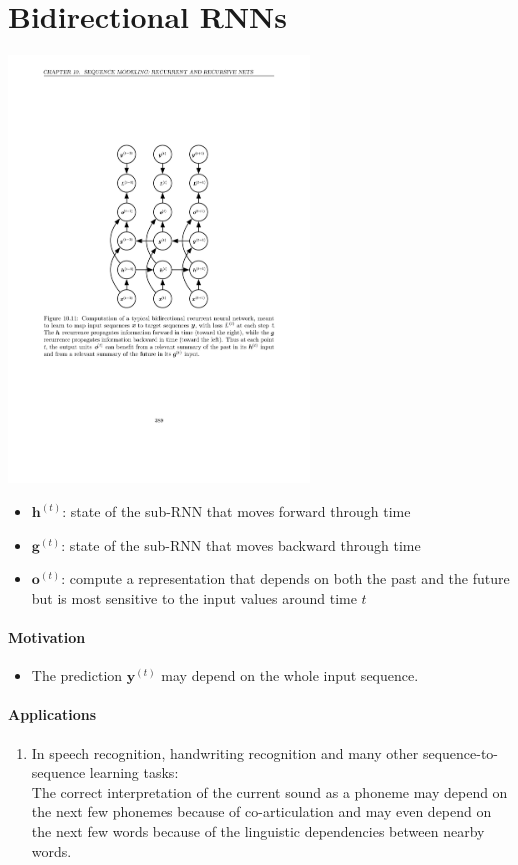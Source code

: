 \documentclass[12pt, a4paper]{article}
\newcommand{\egvg}[1]{\boldsymbol{g}^{(#1)}}
\newcommand{\egvh}[1]{\boldsymbol{h}^{(#1)}}
\newcommand{\egvo}[1]{\boldsymbol{o}^{(#1)}}
\newcommand{\egvy}[1]{\boldsymbol{y}^{(#1)}}
\begin{document}
\section{Bidirectional RNNs}

\begin{center}
    \includegraphics[width=0.6\textwidth]{../imgs/Bi-RNN.pdf}
\end{center}
\begin{itemize}
    \item $\egvh{t}$: state of the sub-RNN that moves forward through time
    \item $\egvg{t}$: state of the sub-RNN that moves backward through time
    \item $\egvo{t}$: compute a representation that depends on both the past and the future but is most sensitive to the input values around time $t$
\end{itemize}

\paragraph{Motivation}
\begin{itemize}
    \item The prediction $\egvy{t}$ may depend on the whole input sequence.
\end{itemize}

\paragraph{Applications}
\begin{enumerate}
    \item{In speech recognition, handwriting recognition and many other sequence-to-sequence learning tasks: \\
        The correct interpretation of the current sound as a phoneme may depend on the next few phonemes because of co-articulation and may even depend on the next few words because of the linguistic dependencies between nearby words.
    }
\end{enumerate}
\end{document}
